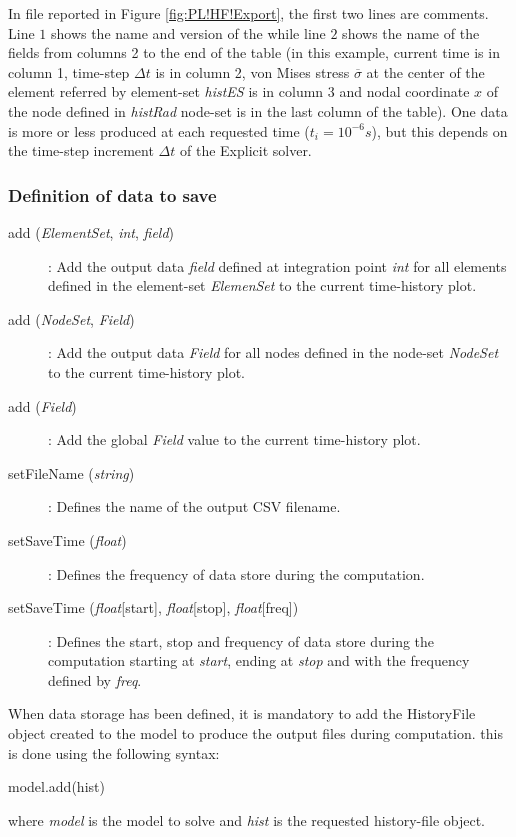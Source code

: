 In file reported in Figure \ref{fig:PL!HF!Export}, the first two lines are comments. Line $1$ shows the name and version of the \DynELA while line $2$ shows the name of the fields from columns 2 to the end of the table (in this example, current time is in column 1, time-step $\Delta t$ is in column 2, von Mises stress $\overline{\sigma}$ at the center of the element referred by element-set \emph{histES} is in column 3 and nodal coordinate $x$ of the node defined in \emph{histRad} node-set is in the last column of the table). One data is more or less produced at each requested time ($t_i=10^{-6}s$), but this depends on the time-step increment $\Delta t$ of the Explicit solver.

\subsubsection{Definition of data to save}

\begin{description}
\item [{add (\emph{ElementSet}, \emph{int}, \emph{field})}] : Add the output data \emph{field} defined at integration point \emph{int} for all elements defined in the element-set \emph{ElemenSet} to the current time-history plot.
\item [{add (\emph{NodeSet}, \emph{Field})}] : Add the output data \emph{Field} for all nodes defined in the node-set \emph{NodeSet} to the current time-history plot.
\item [{add (\emph{Field})}] : Add the global \emph{Field} value to the current time-history plot.
\item [{setFileName (\emph{string})}] : Defines the name of the output CSV filename.
\item [{setSaveTime (\emph{float})}] : Defines the frequency of data store during the computation.
\item [{setSaveTime (\emph{float}[start], \emph{float}[stop], \emph{float}[freq])}] : Defines the start, stop and frequency of data store during the computation starting at \emph{start}, ending at \emph{stop} and with the frequency defined by \emph{freq}.
\end{description}

When data storage has been defined, it is mandatory to add the \textsf{HistoryFile} object created to the \textsf{model} to produce the output files during computation. this is done using the following syntax:
\begin{PythonListing}
model.add(hist)
\end{PythonListing}
where \emph{model} is the \textsf{model} to solve and \emph{hist} is the requested history-file object.

